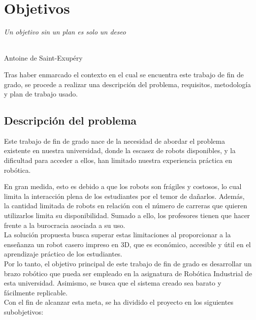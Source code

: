 \chapter{Objetivos}
\label{cap:capitulo3}

\begin{flushright}
\begin{minipage}[]{10cm}
\emph{Un objetivo sin un plan es solo un deseo}\\
\end{minipage}\\

Antoine de Saint-Exupéry\\
\end{flushright}

\vspace{1cm}

Tras haber enmarcado el contexto en el cual se encuentra este trabajo de fin de grado, se procede a realizar
una descripción del problema, requisitos, metodología y plan de trabajo usado.
\section{Descripción del problema}
\label{sec:descripcion}
Este trabajo de fin de grado nace de la necesidad de abordar el problema existente en nuestra universidad, donde la escasez de 
robots disponibles, y la dificultad para acceder a ellos, han limitado nuestra experiencia práctica en robótica.

En gran medida, esto es debido a que los robots son frágiles y costosos, lo cual limita la interacción plena de los estudiantes 
por el temor de dañarlos. Además, la cantidad limitada de robots en relación con el número de carreras que 
quieren utilizarlos limita su disponibilidad. Sumado a ello, los profesores tienen que hacer frente a la burocracia asociada a su uso.
\\ 
La solución propuesta busca superar estas limitaciones al proporcionar a la enseñanza un robot casero impreso en 3D, que es
económico, accesible y útil en el aprendizaje práctico de los estudiantes. 
\\
Por lo tanto, el objetivo principal de este trabajo de fin de grado es desarrollar un brazo robótico que pueda ser empleado en la 
asignatura de Robótica Industrial de esta universidad. Asimismo, se busca que el sistema creado sea barato y fácilmente replicable.
\\
Con el fin de alcanzar esta meta, se ha dividido el proyecto en los siguientes subobjetivos:

